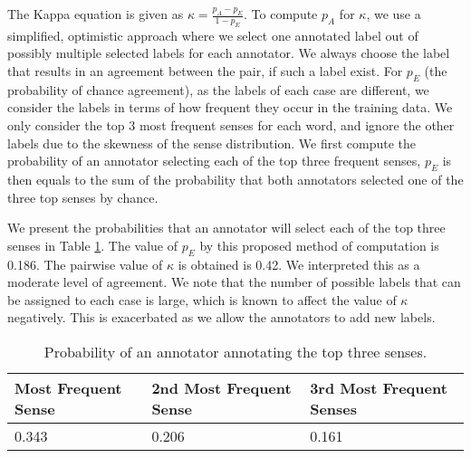 {The Kappa equation is given as 
$\kappa = \frac{p_A - p_E}{1 - p_E} $.
To compute $p_A$ for $\kappa$, we use a simplified, optimistic approach where we select one annotated label out of possibly multiple selected labels for each annotator. We always choose the label that results in an agreement between the pair, if such a label exist. For $p_E$ (the probability of chance agreement), as the labels of each case are different, we consider the labels in terms of how frequent they occur in the training data. We only consider the top 3 most frequent senses for each word, and ignore the other labels due to the skewness of the sense distribution. We first compute the probability of an annotator selecting each of the top three frequent senses, $p_E$ is then equals to the sum of the probability that both annotators selected one of the three top senses by chance. 

We present the probabilities that an annotator will select each of the top three senses in Table \ref{table:IAA}. The value of $p_E$ by this proposed method of computation is 0.186. The pairwise value of $\kappa$ is obtained is 0.42. We interpreted this as a moderate level of agreement. We note that the number of possible labels that can be assigned to each case is large, which is known to affect the value of $\kappa$ negatively. This is exacerbated as we allow the annotators to add new labels. 

\begin{table}[ht]
	\caption{Probability of an annotator annotating the top three senses.}
	\label{table:IAA}
	\begin{center}
		\begin{tabular}{| p{4cm} | p{4cm}  | p{4cm} | }
			\hline
			Most Frequent Sense & 2nd Most Frequent Sense & 3rd Most Frequent Senses\\
			\hline
			0.343 & 0.206 & 0.161\\						
			\hline
		\end{tabular}
	\end{center}
\end{table}

}
